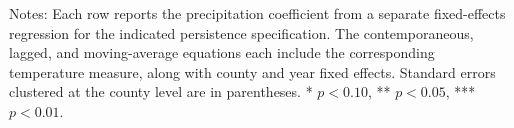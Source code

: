\documentclass[12pt]{article}
\begin{document}
\begin{table}[htbp]
\centering
\caption{NASS Yield Persistence Estimates}
\label{tab:nass_yield_persistence}

\medskip
\parbox{0.96\textwidth}{\footnotesize Notes: Each row reports the precipitation coefficient from a separate fixed-effects regression for the indicated persistence specification. The contemporaneous, lagged, and moving-average equations each include the corresponding temperature measure, along with county and year fixed effects. Standard errors clustered at the county level are in parentheses. * $p<0.10$, ** $p<0.05$, *** $p<0.01$.}
\end{table}
\end{document}
